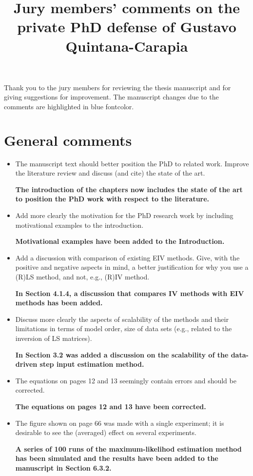 \documentclass[11pt]{article}
\date{\vspace{-10ex}}
\begin{document}
\title{Jury members' comments on the private PhD defense of \linebreak Gustavo Quintana-Carapia} 

\maketitle

Thank you to the jury members for reviewing the thesis manuscript and for giving suggestions for improvement. 
The manuscript changes due to the comments are highlighted in \color{blue} blue fontcolor\color{black}.

\section*{General comments}

\begin{itemize}
	\item The manuscript text should better position the PhD to related work. Improve the literature review and discuss (and cite) the state of the art.
	
	{\bfseries The introduction of the chapters now includes the state of the art to position the PhD work with respect to the literature.}
	
	\item  Add more clearly the motivation for the PhD research work by including motivational examples to the introduction.
	
	{\bfseries Motivational examples have been added to the Introduction. }
	
	\item  Add a discussion with comparison of existing EIV methods. Give, with the positive and negative aspects in mind, a better justification for why you use a (R)LS method, and not, e.g., (R)IV method.
	
	{\bfseries In Section 4.1.4, a discussion that compares IV methods with EIV methods has been added.}

	\item  Discuss more clearly the aspects of scalability of the methods and their limitations in terms of model order, size of data sets (e.g., related to the inversion of LS matrices).
	
	{\bfseries In Section 3.2 was added a discussion on the scalability of the data-driven step input estimation method.}
	
	\item  The equations on pages 12 and 13 seemingly contain errors and should be corrected.
	
	{\bfseries The equations on pages 12 and 13 have been corrected.}
	
	\item  The figure shown on page 66 was made with a single experiment; it is desirable to see the (averaged) effect on several experiments.
	
	{\bfseries A series of 100 runs of the maximum-likelihod estimation method has been simulated and the results have been added to the manuscript in Section 6.3.2.}
	
\end{itemize}
\end{document}

